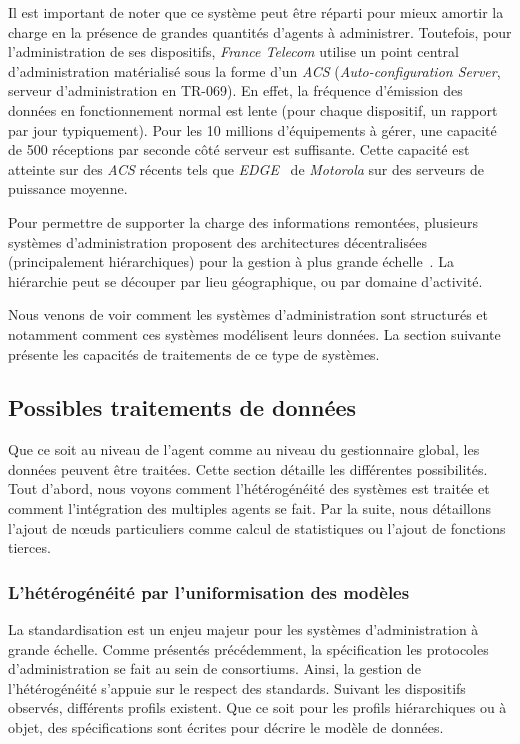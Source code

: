 Il est important de noter que ce système peut être réparti pour mieux amortir la charge en la présence de grandes quantités d'agents à administrer. Toutefois, pour l'administration de ses dispositifs, \textit{France Telecom} utilise un point central d'administration matérialisé sous la forme d'un \textit{ACS} (\textit{Auto-configuration Server}, serveur d'administration en TR-069). En effet, la fréquence d'émission des données en fonctionnement normal est lente (pour chaque dispositif, un rapport par jour typiquement). Pour les 10 millions d'équipements à gérer, une capacité de 500 réceptions par seconde côté serveur est suffisante. Cette capacité est atteinte sur des \textit{ACS} récents tels que \textit{EDGE}~\cite{Motorola:EDGE} de \textit{Motorola} sur des serveurs de puissance moyenne.

Pour permettre de supporter la charge des informations remontées, plusieurs systèmes d'administration proposent des architectures décentralisées (principalement hiérarchiques) pour la gestion à plus grande échelle~\cite{Kessis:management}. La hiérarchie peut se découper par lieu géographique, ou par domaine d'activité.

Nous venons de voir comment les systèmes d'administration sont structurés et notamment comment ces systèmes modélisent leurs données. La section suivante présente les capacités de traitements de ce type de systèmes.

\subsection{Possibles traitements de données}
Que ce soit au niveau de l'agent comme au niveau du gestionnaire global, les données peuvent être traitées. Cette section détaille les différentes possibilités. Tout d'abord, nous voyons comment l'hétérogénéité des systèmes est traitée et comment l'intégration des multiples agents se fait. Par la suite, nous détaillons l'ajout de nœuds particuliers comme calcul de statistiques ou l'ajout de fonctions tierces.

\subsubsection{L'hétérogénéité par l'uniformisation des modèles}
La standardisation est un enjeu majeur pour les systèmes d'administration à grande échelle. Comme présentés précédemment, la spécification les protocoles d'administration se fait au sein de consortiums. Ainsi, la gestion de l'hétérogénéité s'appuie sur le respect des standards. Suivant les dispositifs observés, différents profils existent. Que ce soit pour les profils hiérarchiques ou à objet, des spécifications sont écrites pour décrire le modèle de données.


